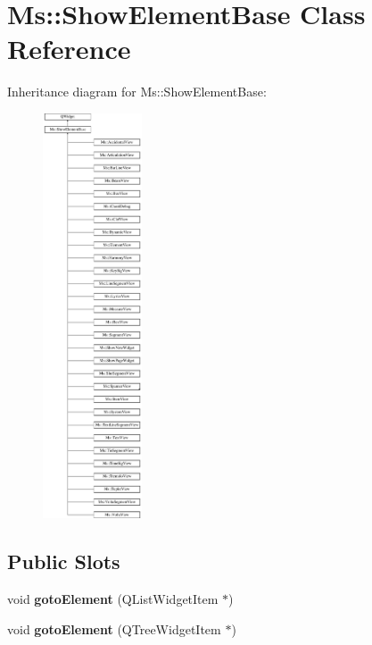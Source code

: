 \hypertarget{class_ms_1_1_show_element_base}{}\section{Ms\+:\+:Show\+Element\+Base Class Reference}
\label{class_ms_1_1_show_element_base}
Inheritance diagram for Ms\+:\+:Show\+Element\+Base\+:\begin{figure}[H]
\begin{center}
\leavevmode
\includegraphics[height=12.000000cm]{class_ms_1_1_show_element_base}
\end{center}
\end{figure}
\subsection*{Public Slots}
\begin{DoxyCompactItemize}
\item 
\mbox{\label{class_ms_1_1_show_element_base_ab37f4e832ae737a7e57d8159a9c9ef27}} 
void {\bfseries goto\+Element} (Q\+List\+Widget\+Item $\ast$)
\item 
\mbox{\label{class_ms_1_1_show_element_base_af270014cd740b6acfe8cb3c6d1357b4a}} 
void {\bfseries goto\+Element} (Q\+Tree\+Widget\+Item $\ast$)
\end{DoxyCompactItemize}
